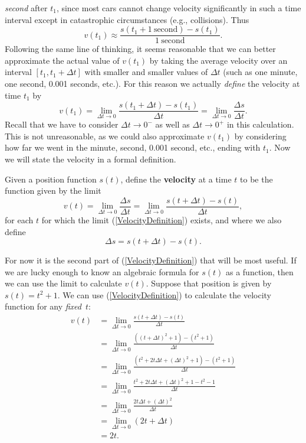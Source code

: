 {\it second} after $t_1$, since most cars cannot change velocity
significantly in such a time interval except in catastrophic
circumstances (e.g., collisions).  Thus\footnotemark
{}
$$v(t_1)\approx \frac{s(t_1+1\ \text{second})-s(t_1)}{1\ \text{second}}.$$
Following the same line of thinking,
it  seems reasonable that we can better approximate
the actual value of $v(t_1)$ by taking the average velocity
over an interval $[t_1,t_1+\Delta t]$ with smaller and smaller
values of $\Delta t$ (such as one minute, one second, 0.001 seconds,
etc.).  For this reason we actually {\it define} the velocity
at time $t_1$ by
$$v(t_1)=\lim_{\Delta t\to0}\frac{s(t_1+\Delta t)-s(t_1)}{\Delta t}
=\lim_{\Delta t\to 0}\frac{\Delta s}{\Delta t}.$$
Recall that we have to consider $\Delta t\to0^-$ as well as
$\Delta t\to0^+$ in this calculation.  This is not unreasonable, 
as we could also approximate $v(t_1)$ by considering how far we
went in the minute, second, 0.001 second, etc., ending with $t_1$.
Now we will state the velocity in a formal definition.
%
\begin{definition}Given a position function $s(t)$, define
the {\bf velocity} at a time $t$ to be the function given by
the limit
\begin{equation}
v(t)=\lim_{\Delta t\to0}\frac{\Delta s}{\Delta t}=
\lim_{\Delta t\to0}\frac{s(t+\Delta t)-s(t)}{\Delta t},
\label{VelocityDefinition}\end{equation}
for each $t$ for which the limit {\rm(\ref{VelocityDefinition})}
exists, and where we also define  
\begin{equation}\Delta s=s(t+\Delta t)-s(t).\end{equation}
\end{definition}
%
For now it is the second part of (\ref{VelocityDefinition})
that will be most useful.  If we are lucky enough to 
know an algebraic formula for $s(t)$ as a function,
then we can use the limit to calculate $v(t)$.
%
\bex Suppose that position is given by
$s(t)=t^2+1$.  We can use (\ref{VelocityDefinition})
to calculate the velocity function for any {\it fixed\,\footnotemark}
 $t$:
\begin{align*}
v(t)&=\lim_{\Delta t\to0}\frac{s(t+\Delta t)-s(t)}{\Delta t}\\
&= \lim_{\Delta t\to0}\frac{\left((t+\Delta t)^2+1\right)
    -\left(t^2+1\right)}{\Delta t}\\
&=\lim_{\Delta t\to0}\frac{(t^2+2t\Delta t+(\Delta t)^2+1)
-(t^2+1)}{\Delta t}\\
&=\lim_{\Delta t\to0}\frac{t^2+2t\Delta t+(\Delta t)^2
+1-t^2-1}{\Delta t}\\
&=\lim_{\Delta t\to0}\frac{2t\Delta t+(\Delta t)^2}{\Delta t}\\
&=\lim_{\Delta t\to0}\left(2t+\Delta t\right)\\
&=2t.\end{align*}
